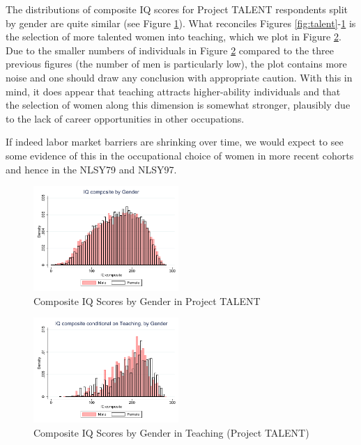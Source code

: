 \documentclass[onehalfspacing,11pt]{article}
\begin{document}
The distributions of composite IQ scores for Project TALENT respondents split by gender are quite similar (see Figure \ref{fig:IQbygender}). What reconciles Figures \ref{fig:talent}-\ref{fig:IQbygender} is the selection of more talented women into teaching, which we plot in Figure \ref{fig:IQbygenderteach}. Due to the smaller numbers of individuals in Figure \ref{fig:IQbygenderteach} compared to the three previous figures (the number of men is particularly low), the plot contains more noise and one should draw any conclusion with appropriate caution. With this in mind, it does appear that teaching attracts higher-ability individuals and that the selection of women along this dimension is somewhat stronger, plausibly due to the lack of career opportunities in other occupations.

If indeed labor market barriers are shrinking over time, we would expect to see some evidence of this in the occupational choice of women in more recent cohorts and hence in the NLSY79 and NLSY97.

\begin{figure}
\begin{center}
\includegraphics[width=0.49\textwidth]{iq_by_gender.pdf}
\caption{Composite IQ Scores by Gender in Project TALENT}
\label{fig:IQbygender}
\end{center}
\end{figure}

\begin{figure}
\begin{center}
\includegraphics[width=0.49\textwidth]{iq_by_gen_teach.pdf}
\caption{Composite IQ Scores by Gender in Teaching (Project TALENT)}
\label{fig:IQbygenderteach}
\end{center}
\end{figure}
\end{document}
